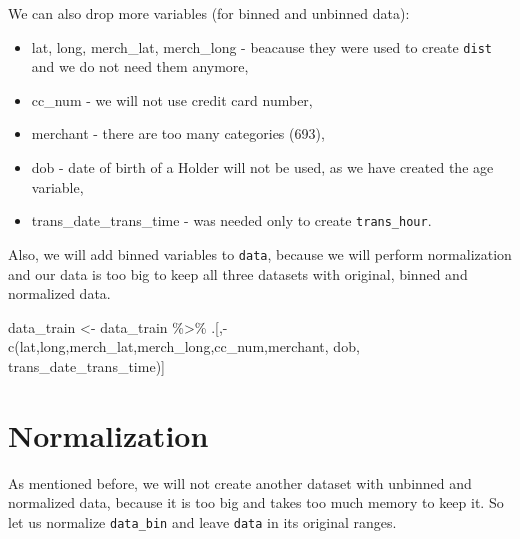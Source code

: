 \documentclass[
]{report}
\newenvironment{Shaded}{\begin{snugshade}}{\end{snugshade}}
\newcommand{\FunctionTok}[1]{\textcolor[rgb]{0.00,0.00,0.00}{#1}}
\newcommand{\NormalTok}[1]{#1}
\newcommand{\OtherTok}[1]{\textcolor[rgb]{0.56,0.35,0.01}{#1}}
\newcommand{\SpecialCharTok}[1]{\textcolor[rgb]{0.00,0.00,0.00}{#1}}
\newcommand{\StringTok}[1]{\textcolor[rgb]{0.31,0.60,0.02}{#1}}
\providecommand{\tightlist}{%
  \setlength{\itemsep}{0pt}\setlength{\parskip}{0pt}}
\begin{document}
We can also drop more variables (for binned and unbinned data):

\begin{itemize}
\tightlist
\item
  lat, long, merch\_lat, merch\_long - beacause they were used to create
  \texttt{dist} and we do not need them anymore,
\item
  cc\_num - we will not use credit card number,
\item
  merchant - there are too many categories (693),
\item
  dob - date of birth of a Holder will not be used, as we have created
  the age variable,
\item
  trans\_date\_trans\_time - was needed only to create
  \texttt{trans\_hour}.
\end{itemize}

Also, we will add binned variables to \texttt{data}, because we will
perform normalization and our data is too big to keep all three datasets
with original, binned and normalized data.

\begin{Shaded}
\begin{Highlighting}[]
\NormalTok{data\_train }\OtherTok{\textless{}{-}}\NormalTok{ data\_train }\SpecialCharTok{\%\textgreater{}\%} 
\NormalTok{  .[,}\SpecialCharTok{{-}}\FunctionTok{c}\NormalTok{(}\StringTok{\textquotesingle{}lat\textquotesingle{}}\NormalTok{,}\StringTok{\textquotesingle{}long\textquotesingle{}}\NormalTok{,}\StringTok{\textquotesingle{}merch\_lat\textquotesingle{}}\NormalTok{,}\StringTok{\textquotesingle{}merch\_long\textquotesingle{}}\NormalTok{,}\StringTok{\textquotesingle{}cc\_num\textquotesingle{}}\NormalTok{,}\StringTok{\textquotesingle{}merchant\textquotesingle{}}\NormalTok{, }\StringTok{\textquotesingle{}dob\textquotesingle{}}\NormalTok{, }\StringTok{\textquotesingle{}trans\_date\_trans\_time\textquotesingle{}}\NormalTok{)]}
\end{Highlighting}
\end{Shaded}

\hypertarget{normalization}{%
\section{Normalization}\label{normalization}}

As mentioned before, we will not create another dataset with unbinned
and normalized data, because it is too big and takes too much memory to
keep it. So let us normalize \texttt{data\_bin} and leave \texttt{data}
in its original ranges.
\end{document}

